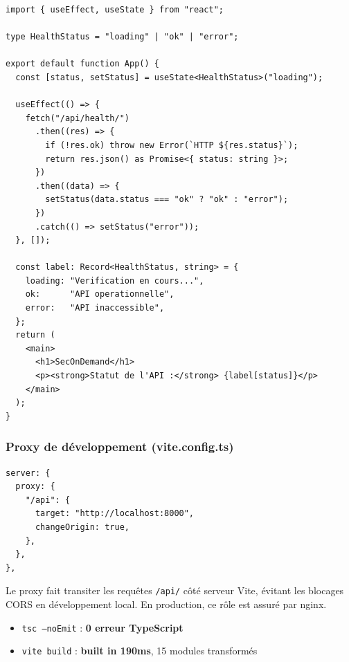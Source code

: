 \documentclass[11pt,a4paper]{article}
\begin{document}
\begin{lstlisting}[caption={web/src/App.tsx --- appel /api/health/ et affichage du statut}]
import { useEffect, useState } from "react";

type HealthStatus = "loading" | "ok" | "error";

export default function App() {
  const [status, setStatus] = useState<HealthStatus>("loading");

  useEffect(() => {
    fetch("/api/health/")
      .then((res) => {
        if (!res.ok) throw new Error(`HTTP ${res.status}`);
        return res.json() as Promise<{ status: string }>;
      })
      .then((data) => {
        setStatus(data.status === "ok" ? "ok" : "error");
      })
      .catch(() => setStatus("error"));
  }, []);

  const label: Record<HealthStatus, string> = {
    loading: "Verification en cours...",
    ok:      "API operationnelle",
    error:   "API inaccessible",
  };
  return (
    <main>
      <h1>SecOnDemand</h1>
      <p><strong>Statut de l'API :</strong> {label[status]}</p>
    </main>
  );
}
\end{lstlisting}

\subsubsection*{Proxy de développement (vite.config.ts)}

\begin{lstlisting}[caption={web/vite.config.ts --- proxy /api/ vers le backend Django}]
server: {
  proxy: {
    "/api": {
      target: "http://localhost:8000",
      changeOrigin: true,
    },
  },
},
\end{lstlisting}

Le proxy fait transiter les requêtes \texttt{/api/} côté serveur Vite, évitant les blocages
CORS en développement local. En production, ce rôle est assuré par nginx.

\begin{successbox}[Vérifications]
\begin{itemize}[noitemsep]
  \item \texttt{tsc --noEmit} : \textbf{0 erreur TypeScript}
  \item \texttt{vite build} : \textbf{built in 190ms}, 15 modules transformés
\end{itemize}
\end{successbox}

\end{document}
